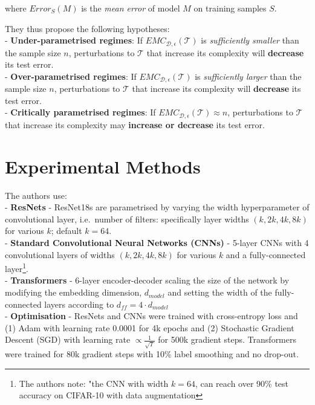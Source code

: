 \documentclass[]{article}
\begin{document}
where \(Error_S(M)\) is the \emph{mean error} of model \(M\) on training
samples \(S\).

They thus propose the following hypotheses:\\
- \textbf{Under-parametrised regimes}: If
\(EMC_{\mathcal{D}, \epsilon}(\mathcal{T})\) is \emph{sufficiently
smaller} than the sample size \(n\), perturbations to \(\mathcal{T}\)
that increase its complexity will \textbf{decrease} its test error.\\
- \textbf{Over-parametrised regimes}: If
\(EMC_{\mathcal{D}, \epsilon}(\mathcal{T})\) is \emph{sufficiently
larger} than the sample size \(n\), perturbations to \(\mathcal{T}\)
that increase its complexity will \textbf{decrease} its test error.\\
- \textbf{Critically parametrised regimes}: If
\(EMC_{\mathcal{D}, \epsilon}(\mathcal{T}) \approx n\), perturbations to
\(\mathcal{T}\) that increase its complexity may \textbf{increase or
decrease} its test error.

\section{Experimental Methods}

The authors use:\\
- \textbf{ResNets} - ResNet18s are parametrised by varying the width
hyperparameter of convolutional layer, i.e.~number of filters:
specifically layer widths \((k, 2k, 4k, 8k)\) for various \(k\); default
\(k=64\).\\
- \textbf{Standard Convolutional Neural Networks (CNNs)} - 5-layer CNNs
with 4 convolutional layers of widths \((k, 2k, 4k, 8k)\) for various
\(k\) and a fully-connected layer\footnote{The authors note: "the CNN
  with width \(k = 64\), can reach over 90\% test accuracy on CIFAR-10
  with data augmentation}.\\
- \textbf{Transformers} - 6-layer encoder-decoder scaling the size of
the network by modifying the embedding dimension, \(d_{model}\) and
setting the width of the fully-connected layers according to
\(d_{ff} = 4 \cdot d_{model}\)\\
- \textbf{Optimisation} - ResNets and CNNs were trained with
cross-entropy loss and (1) Adam with learning rate 0.0001 for 4k epochs
and (2) Stochastic Gradient Descent (SGD) with learning rate
\(\propto \frac{1}{\sqrt{T}}\) for 500k gradient steps. Transformers
were trained for 80k gradient steps with 10\% label smoothing and no
drop-out.
\end{document}
